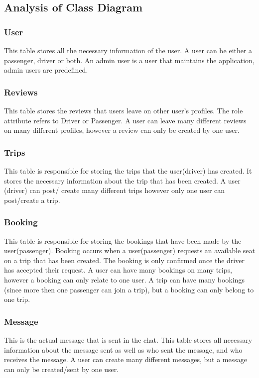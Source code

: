 \documentclass[hidelinks, 12pt, a4paper]{article}
\begin{document}
\subsection{Analysis of Class Diagram}

\subsubsection{User}
This table stores all the necessary information of the user. A user can be either a passenger, driver or both.
An admin user is a user that maintains the application, admin users are predefined.

\subsubsection{Reviews}
This table stores the reviews that users leave on other user’s profiles. The role attribute refers to Driver or Passenger. A user can leave many different reviews on many different profiles, however a review can only be created by one user.

\subsubsection{Trips}
This table is responsible for storing the trips that the user(driver) has created. It stores the necessary information about the trip that has been created. A user (driver) can post/ create many different trips however only one user can post/create a trip.

\subsubsection{Booking}
This table is responsible for storing the bookings that have been made by the user(passenger). Booking occurs when a user(passenger) requests an available seat on a trip that has been created. The booking is only confirmed once the driver has accepted their request. A user can have many bookings on many trips, however a booking can only relate to one user. A trip can have many bookings (since more then one passenger can join a trip), but a booking can only belong to one trip.

\subsubsection{Message}
This is the actual message that is sent in the chat. This table stores all necessary information about the message sent as well as who sent the message, and who receives the message. A user can create many different messages, but a message can only be created/sent by one user.
\end{document}
